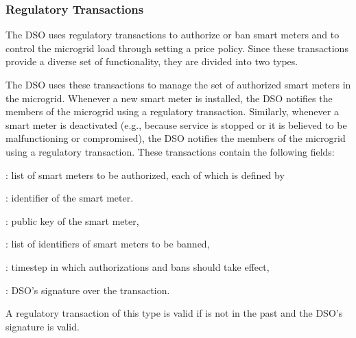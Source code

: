 \subsubsection{Regulatory Transactions}

The DSO uses regulatory transactions to authorize or ban smart meters and to control the microgrid load through setting a price policy.
Since these transactions provide a diverse set of functionality, they are divided into two types.


The DSO uses these transactions to manage the set of authorized smart meters in the microgrid.
Whenever a new smart meter is installed, the DSO notifies the members of the microgrid using a regulatory transaction.
Similarly, whenever a smart meter is deactivated (e.g., because service is stopped or it is believed to be malfunctioning or compromised), the DSO notifies the members of the microgrid using a regulatory transaction.
These transactions contain the following fields:
\begin{compactitem}
\item {}: list of smart meters to be authorized, each of which is defined by
\begin{compactitem}
\item {}: identifier of the smart meter.
\item {}: public key of the smart meter,
\end{compactitem}
\item {}: list of identifiers of smart meters to be banned, 
\item {}: timestep in which authorizations and bans should take effect,
\item {}: DSO's signature over the transaction.
\end{compactitem}

A regulatory transaction of this type is valid if %
{} is not in the past and %
the DSO's signature is valid.


